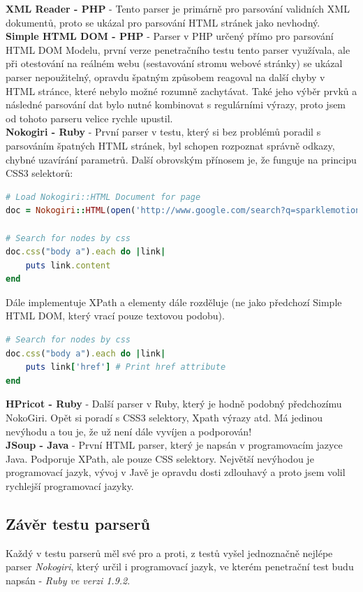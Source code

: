 \documentclass[12pt, a4paper]{report}
\begin{document}
\textbf{XML Reader - PHP} - Tento parser je primárně pro parsování validních XML dokumentů, proto se ukázal pro parsování HTML stránek jako nevhodný.\\
\newline
\textbf{Simple HTML DOM - PHP} - Parser v PHP určený přímo pro parsování HTML DOM Modelu, první verze penetračního testu tento parser využívala, ale při otestování na reálném webu (sestavování stromu webové stránky) se ukázal parser nepoužitelný, opravdu špatným způsobem reagoval na další chyby v HTML stránce, které nebylo možné rozumně zachytávat. Také jeho výběr prvků a následné parsování dat bylo nutné kombinovat s regulárními výrazy, proto jsem od tohoto parseru velice rychle upustil.\\
\newline
\textbf{Nokogiri - Ruby} - První parser v testu, který si bez problémů poradil s parsováním špatných HTML stránek, byl schopen rozpoznat správně odkazy, chybné uzavírání parametrů. Další obrovským přínosem je, že funguje na principu CSS3 selektorů:
\begin{lstlisting}[label=some-code,language=Ruby, caption=CSS3 Selektory NokoGiri]
# Load Nokogiri::HTML Document for page
doc = Nokogiri::HTML(open('http://www.google.com/search?q=sparklemotion'))

# Search for nodes by css
doc.css("body a").each do |link|
	puts link.content
end
\end{lstlisting}
Dále implementuje XPath a elementy dále rozděluje (ne jako předchozí Simple HTML DOM, který vrací pouze textovou podobu).
\begin{lstlisting}[label=some-code,language=Ruby, caption=Parsování]
# Search for nodes by css
doc.css("body a").each do |link|
	puts link['href'] # Print href attribute
end
\end{lstlisting}

\textbf{HPricot - Ruby} - Další parser v Ruby, který je hodně podobný předchozímu NokoGiri. Opět si poradí s CSS3 selektory, Xpath výrazy atd. Má jedinou nevýhodu a tou je, že už není dále vyvíjen a podporován!\\
\newline
\textbf{JSoup - Java} - První HTML parser, který je napsán v programovacím jazyce Java. Podporuje XPath, ale pouze CSS selektory. Největší nevýhodou je programovací jazyk, vývoj v Javě je opravdu dosti zdlouhavý a proto jsem volil rychlejší programovací jazyky.

\subsection{Závěr testu parserů}
Každý v testu parserů měl své pro a proti, z testů vyšel jednoznačně nejlépe parser \textit{Nokogiri}, který určil i programovací jazyk, ve kterém penetrační test budu napsán - \textit{Ruby ve verzi 1.9.2}. 
\end{document}
